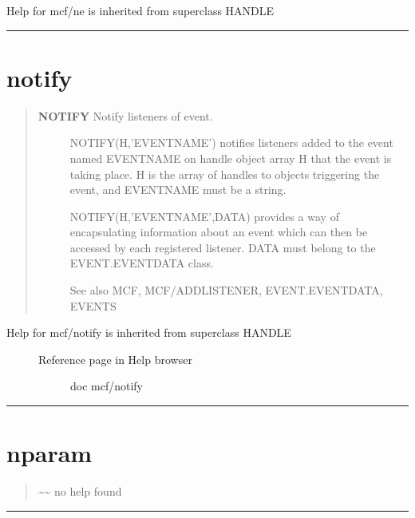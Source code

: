 \documentclass[letterpaper,10pt,english]{sphinxmanual}
\begin{document}
Help for mcf/ne is inherited from superclass HANDLE


\bigskip\hrule{}\bigskip



\section{notify}
\label{classes/utils/@mcf/mcf:notify}\label{classes/utils/@mcf/mcf:id24}\begin{quote}
\begin{description}
\item[{\textbf{NOTIFY}   Notify listeners of event.}] \leavevmode
NOTIFY(H,'EVENTNAME') notifies listeners added to the event named
EVENTNAME on handle object array H that the event is taking place.
H is the array of handles to objects triggering the event, and
EVENTNAME must be a string.

NOTIFY(H,'EVENTNAME',DATA) provides a way of encapsulating information
about an event which can then be accessed by each registered listener.
DATA must belong to the EVENT.EVENTDATA class.

See also MCF, MCF/ADDLISTENER, EVENT.EVENTDATA, EVENTS

\end{description}
\end{quote}
\begin{description}
\item[{Help for mcf/notify is inherited from superclass HANDLE}] \leavevmode\begin{description}
\item[{Reference page in Help browser}] \leavevmode
doc mcf/notify

\end{description}

\end{description}


\bigskip\hrule{}\bigskip



\section{nparam}
\label{classes/utils/@mcf/mcf:id25}\label{classes/utils/@mcf/mcf:nparam}\begin{quote}

\textasciitilde{}\textasciitilde{} no help found
\end{quote}


\bigskip\hrule{}\bigskip
\end{document}
